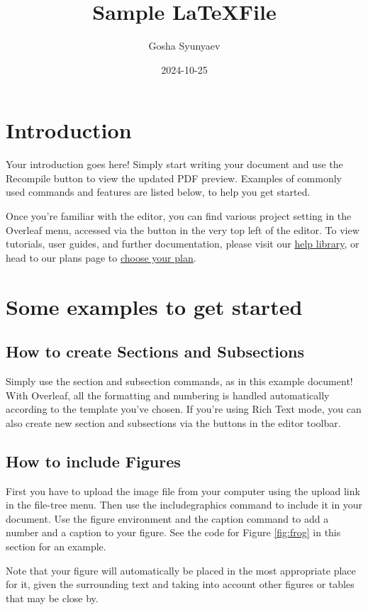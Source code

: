 \documentclass[
  12pt,
  letterpaper,
  DIV=11,
  numbers=noendperiod]{scrartcl}
\title{Sample \LaTeX File}
\author{Gosha Syunyaev}
\date{2024-10-25}
\begin{document}
\maketitle


\section{Introduction}

Your introduction goes here! Simply start writing your document and use
the Recompile button to view the updated PDF preview. Examples of
commonly used commands and features are listed below, to help you get
started.

Once you're familiar with the editor, you can find various project
setting in the Overleaf menu, accessed via the button in the very top
left of the editor. To view tutorials, user guides, and further
documentation, please visit our
\href{https://www.overleaf.com/learn}{help library}, or head to our
plans page to
\href{https://www.overleaf.com/user/subscription/plans}{choose your plan}.

\section{Some examples to get started}

\subsection{How to create Sections and Subsections}

Simply use the section and subsection commands, as in this example
document! With Overleaf, all the formatting and numbering is handled
automatically according to the template you've chosen. If you're using
Rich Text mode, you can also create new section and subsections via the
buttons in the editor toolbar.

\subsection{How to include Figures}

First you have to upload the image file from your computer using the
upload link in the file-tree menu. Then use the includegraphics command
to include it in your document. Use the figure environment and the
caption command to add a number and a caption to your figure. See the
code for Figure \ref{fig:frog} in this section for an example.

Note that your figure will automatically be placed in the most
appropriate place for it, given the surrounding text and taking into
account other figures or tables that may be close by.
\end{document}

